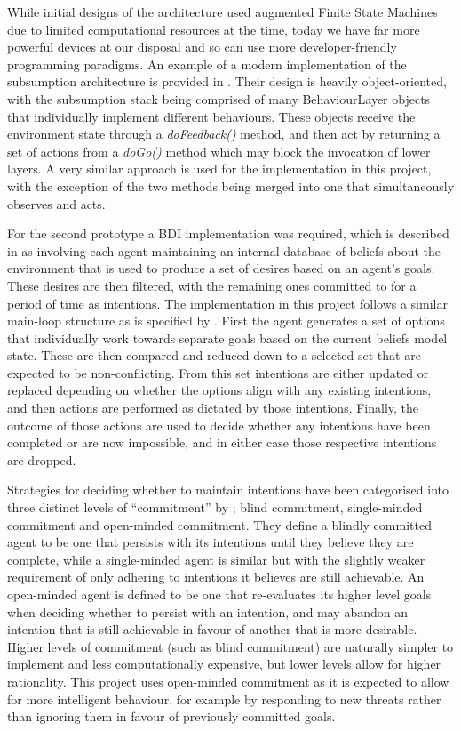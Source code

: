 \documentclass[a4paper,12pt]{article}
\begin{document}
While initial designs of the architecture used augmented Finite State Machines \cite{brooks86} due to limited computational resources at the time, today we have far more powerful devices at our disposal and so can use more developer-friendly programming paradigms. An example of a modern implementation of the subsumption architecture is provided in . Their design is heavily object-oriented, with the subsumption stack being comprised of many BehaviourLayer objects that individually implement different behaviours. These objects receive the environment state through a \emph{doFeedback()} method, and then act by returning a set of actions from a \emph{doGo()} method which may block the invocation of lower layers. A very similar approach is used for the implementation in this project, with the exception of the two methods being merged into one that simultaneously observes and acts.

For the second prototype a BDI implementation was required, which is described in  as involving each agent maintaining an internal database of beliefs about the environment that is used to produce a set of desires based on an agent's goals. These desires are then filtered, with the remaining ones committed to for a period of time as intentions. The implementation in this project follows a similar main-loop structure as is specified by . First the agent generates a set of options that individually work towards separate goals based on the current beliefs model state. These are then compared and reduced down to a selected set that are expected to be non-conflicting. From this set intentions are either updated or replaced depending on whether the options align with any existing intentions, and then actions are performed as dictated by those intentions. Finally, the outcome of those actions are used to decide whether any intentions have been completed or are now impossible, and in either case those respective intentions are dropped.

Strategies for deciding whether to maintain intentions have been categorised into three distinct levels of ``commitment'' by ; blind commitment, single-minded commitment and open-minded commitment. They define a blindly committed agent to be one that persists with its intentions until they believe they are complete, while a single-minded agent is similar but with the slightly weaker requirement of only adhering to intentions it believes are still achievable. An open-minded agent is defined to be one that re-evaluates its higher level goals when deciding whether to persist with an intention, and may abandon an intention that is still achievable in favour of another that is more desirable. Higher levels of commitment (such as blind commitment) are naturally simpler to implement and less computationally expensive, but lower levels allow for higher rationality. This project uses open-minded commitment as it is expected to allow for more intelligent behaviour, for example by responding to new threats rather than ignoring them in favour of previously committed goals.
\end{document}
